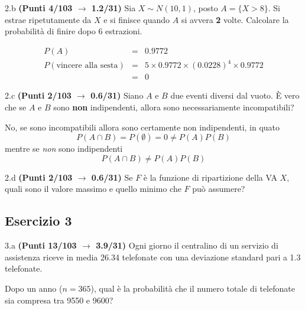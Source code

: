 \documentclass[
  11pt,
]{book}
\theoremstyle{mytheoremstyle}
\theoremstyle{mydefstyle}
\newenvironment{sol}
  {
  \begin{tcolorbox}[enhanced,breakable,arc=0.1mm,boxrule=1pt,colback=white,colframe=iblue,
  title=\bf \fontfamily{lmss}\selectfont \hspace{.5 cm} Soluzione,drop fuzzy shadow]

}{
\end{tcolorbox}
  }
\begin{document}
2.b \textbf{(Punti 4/103 \(\rightarrow\) 1.2/31)} Sia \(X\sim N(10,1)\), posto \(A=\{X>8\}\). Si estrae ripetutamente da \(X\) e si finisce quando \(A\) si avvera \textbf{2} volte. Calcolare la probabilità di finire dopo 6 estrazioni.

\begin{sol}
\begin{eqnarray*}
P(A)&=&0.9772\\
P(\text{vincere alla sesta})&=&5\times0.9772\times (0.0228)^4\times 0.9772\\
&=& 0
\end{eqnarray*}

\end{sol}

2.c \textbf{(Punti 2/103 \(\rightarrow\) 0.6/31)} Siano \(A\) e \(B\) due eventi diversi dal vuoto. È vero che se \(A\) e \(B\) sono
\textbf{non} indipendenti, allora sono necessariamente incompatibili?

\begin{sol}
No, se sono incompatibili allora sono certamente non indipendenti, in quato
\[
P(A\cap B)=P(\emptyset)=0\ne P(A)P(B)
\]
mentre se \emph{non} sono indipendenti
\[
P(A\cap B)\ne P(A)P(B)
\]

\end{sol}

2.d \textbf{(Punti 2/103 \(\rightarrow\) 0.6/31)} Se \(F\) è la funzione di ripartizione della VA \(X\),
quali sono il valore massimo e quello minimo che \(F\) può assumere?

\subsection{Esercizio 3}\label{esercizio-3-12}

3.a \textbf{(Punti 13/103 \(\rightarrow\) 3.9/31)} Ogni giorno il centralino di un servizio di assistenza riceve in media 26.34 telefonate con una deviazione standard pari a 1.3 telefonate.

Dopo un anno (\(n=365\)), qual è la probabilità che il numero totale di telefonate sia compresa tra 9550 e 9600?
\end{document}
